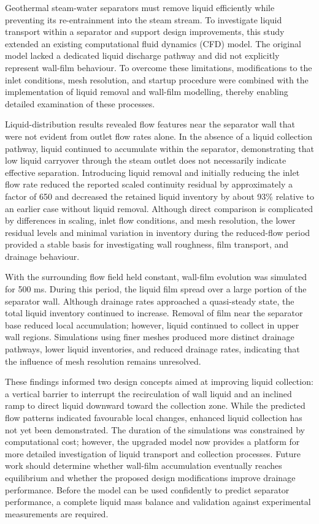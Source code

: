 \documentclass[12pt]{article}
\begin{document}
\hypersetup{pageanchor=false}

\hypersetup{pageanchor=true}

Geothermal steam-water separators must remove liquid efficiently while preventing its re-entrainment into the steam stream. To investigate liquid transport within a separator and support design improvements, this study extended an existing computational fluid dynamics (CFD) model. The original model lacked a dedicated liquid discharge pathway and did not explicitly represent wall-film behaviour. To overcome these limitations, modifications to the inlet conditions, mesh resolution, and startup procedure were combined with the implementation of liquid removal and wall-film modelling, thereby enabling detailed examination of these processes.

Liquid-distribution results revealed flow features near the separator wall that were not evident from outlet flow rates alone. In the absence of a liquid collection pathway, liquid continued to accumulate within the separator, demonstrating that low liquid carryover through the steam outlet does not necessarily indicate effective separation. Introducing liquid removal and initially reducing the inlet flow rate reduced the reported scaled continuity residual by approximately a factor of 650 and decreased the retained liquid inventory by about 93\% relative to an earlier case without liquid removal. Although direct comparison is complicated by differences in scaling, inlet flow conditions, and mesh resolution, the lower residual levels and minimal variation in inventory during the reduced-flow period provided a stable basis for investigating wall roughness, film transport, and drainage behaviour.

With the surrounding flow field held constant, wall-film evolution was simulated for 500 ms. During this period, the liquid film spread over a large portion of the separator wall. Although drainage rates approached a quasi-steady state, the total liquid inventory continued to increase. Removal of film near the separator base reduced local accumulation; however, liquid continued to collect in upper wall regions. Simulations using finer meshes produced more distinct drainage pathways, lower liquid inventories, and reduced drainage rates, indicating that the influence of mesh resolution remains unresolved.

These findings informed two design concepts aimed at improving liquid collection: a vertical barrier to interrupt the recirculation of wall liquid and an inclined ramp to direct liquid downward toward the collection zone. While the predicted flow patterns indicated favourable local changes, enhanced liquid collection has not yet been demonstrated. The duration of the simulations was constrained by computational cost; however, the upgraded model now provides a platform for more detailed investigation of liquid transport and collection processes. Future work should determine whether wall-film accumulation eventually reaches equilibrium and whether the proposed design modifications improve drainage performance. Before the model can be used confidently to predict separator performance, a complete liquid mass balance and validation against experimental measurements are required.
\end{document}
